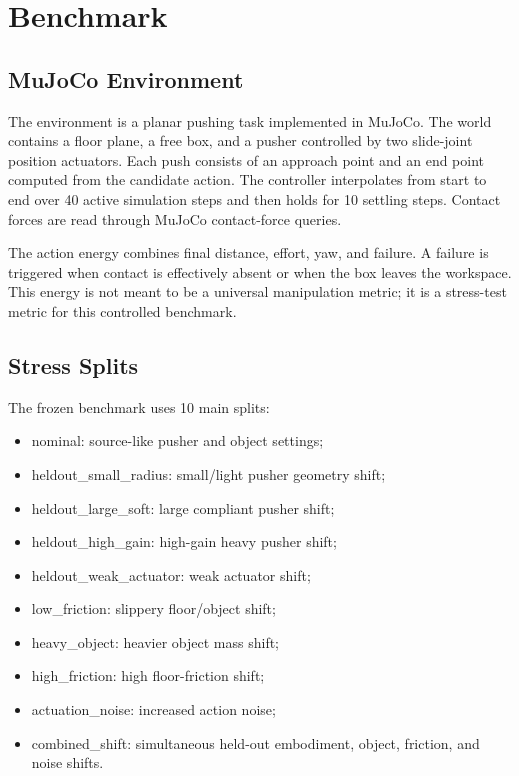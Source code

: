 \documentclass{article}
\begin{document}
\section{Benchmark}

\subsection{MuJoCo Environment}

The environment is a planar pushing task implemented in MuJoCo. The world contains a floor plane, a free box, and a pusher controlled by two slide-joint position actuators. Each push consists of an approach point and an end point computed from the candidate action. The controller interpolates from start to end over 40 active simulation steps and then holds for 10 settling steps. Contact forces are read through MuJoCo contact-force queries.

The action energy combines final distance, effort, yaw, and failure. A failure is triggered when contact is effectively absent or when the box leaves the workspace. This energy is not meant to be a universal manipulation metric; it is a stress-test metric for this controlled benchmark.

\subsection{Stress Splits}

The frozen benchmark uses 10 main splits:

\begin{itemize}
\item nominal: source-like pusher and object settings;
\item heldout\_small\_radius: small/light pusher geometry shift;
\item heldout\_large\_soft: large compliant pusher shift;
\item heldout\_high\_gain: high-gain heavy pusher shift;
\item heldout\_weak\_actuator: weak actuator shift;
\item low\_friction: slippery floor/object shift;
\item heavy\_object: heavier object mass shift;
\item high\_friction: high floor-friction shift;
\item actuation\_noise: increased action noise;
\item combined\_shift: simultaneous held-out embodiment, object, friction, and noise shifts.
\end{itemize}
\end{document}

